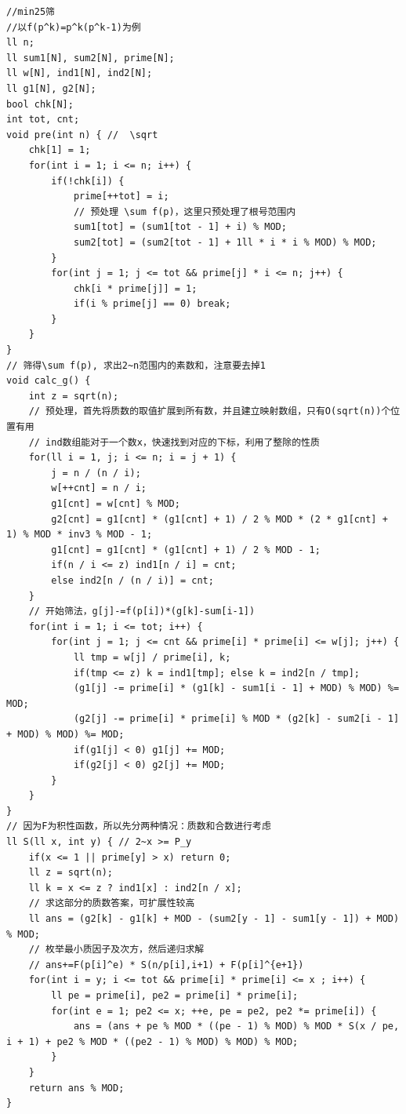 \documentclass[a4paper,11pt,twoside,fontset = fandol,UTF8]{ctexbook} %
\begin{document}
	\begin{lstlisting}
//min25筛
//以f(p^k)=p^k(p^k-1)为例 
ll n;
ll sum1[N], sum2[N], prime[N];
ll w[N], ind1[N], ind2[N];
ll g1[N], g2[N];
bool chk[N];
int tot, cnt;
void pre(int n) { //  \sqrt
    chk[1] = 1;
    for(int i = 1; i <= n; i++) {
        if(!chk[i]) {
            prime[++tot] = i;
            // 预处理 \sum f(p)，这里只预处理了根号范围内 
            sum1[tot] = (sum1[tot - 1] + i) % MOD;
            sum2[tot] = (sum2[tot - 1] + 1ll * i * i % MOD) % MOD;
        }
        for(int j = 1; j <= tot && prime[j] * i <= n; j++) {
            chk[i * prime[j]] = 1;
            if(i % prime[j] == 0) break;
        }
    }
}
// 筛得\sum f(p), 求出2~n范围内的素数和，注意要去掉1 
void calc_g() {
    int z = sqrt(n);
    // 预处理，首先将质数的取值扩展到所有数，并且建立映射数组，只有O(sqrt(n))个位置有用 
    // ind数组能对于一个数x，快速找到对应的下标，利用了整除的性质 
    for(ll i = 1, j; i <= n; i = j + 1) {
        j = n / (n / i);
        w[++cnt] = n / i;
        g1[cnt] = w[cnt] % MOD;
        g2[cnt] = g1[cnt] * (g1[cnt] + 1) / 2 % MOD * (2 * g1[cnt] + 1) % MOD * inv3 % MOD - 1;
        g1[cnt] = g1[cnt] * (g1[cnt] + 1) / 2 % MOD - 1;
        if(n / i <= z) ind1[n / i] = cnt;
        else ind2[n / (n / i)] = cnt;
    } 
    // 开始筛法，g[j]-=f(p[i])*(g[k]-sum[i-1]) 
    for(int i = 1; i <= tot; i++) {
        for(int j = 1; j <= cnt && prime[i] * prime[i] <= w[j]; j++) {
            ll tmp = w[j] / prime[i], k;
            if(tmp <= z) k = ind1[tmp]; else k = ind2[n / tmp];
            (g1[j] -= prime[i] * (g1[k] - sum1[i - 1] + MOD) % MOD) %= MOD;
            (g2[j] -= prime[i] * prime[i] % MOD * (g2[k] - sum2[i - 1] + MOD) % MOD) %= MOD;
            if(g1[j] < 0) g1[j] += MOD;
            if(g2[j] < 0) g2[j] += MOD;
        }
    }
}
// 因为F为积性函数，所以先分两种情况：质数和合数进行考虑 
ll S(ll x, int y) { // 2~x >= P_y
    if(x <= 1 || prime[y] > x) return 0;
    ll z = sqrt(n);
    ll k = x <= z ? ind1[x] : ind2[n / x];  
    // 求这部分的质数答案，可扩展性较高 
    ll ans = (g2[k] - g1[k] + MOD - (sum2[y - 1] - sum1[y - 1]) + MOD) % MOD;
    // 枚举最小质因子及次方，然后递归求解
    // ans+=F(p[i]^e) * S(n/p[i],i+1) + F(p[i]^{e+1})
    for(int i = y; i <= tot && prime[i] * prime[i] <= x ; i++) {
        ll pe = prime[i], pe2 = prime[i] * prime[i];
        for(int e = 1; pe2 <= x; ++e, pe = pe2, pe2 *= prime[i]) {
            ans = (ans + pe % MOD * ((pe - 1) % MOD) % MOD * S(x / pe, i + 1) + pe2 % MOD * ((pe2 - 1) % MOD) % MOD) % MOD;
        }
    }
    return ans % MOD;
}
	\end{lstlisting}
	
\end{document}
